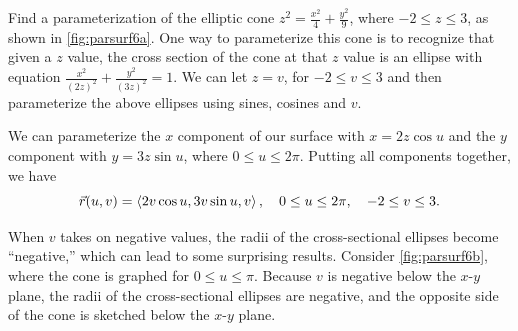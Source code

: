 \begin{example}\label{ex_parsurf6}%
Find
%
%
a parameterization of the elliptic cone $z^2 = \frac{x^2}{4}+\frac{y^2}{9}$, where $-2\leq z\leq 3$, as shown in \autoref{fig:parsurf6a}.
\solution
One way to parameterize this cone is to recognize that given a $z$ value, the cross section of the cone at that $z$ value is an ellipse with equation $\frac{x^2}{(2z)^2} + \frac{y^2}{(3z)^2}=1$. We can let $z=v$, for $-2\leq v\leq 3$ and then parameterize the above ellipses using sines, cosines and $v$.

We can parameterize the $x$ component of our surface with $x=2z\cos u$ and the $y$ component with $y=3z\sin u$, where $0\leq u\leq 2\pi$. Putting all components together, we have
%
%
\[
\vec r(u,v) = \left\langle 2v\cos u, 3v\sin u, v\right\rangle,
\quad 0\leq u\leq 2\pi,\quad -2\leq v\leq 3.
\]

When $v$ takes on negative values, the radii of the cross-sectional ellipses become ``negative,'' which can lead to some surprising results. Consider \autoref{fig:parsurf6b}, where the cone is graphed for $0\leq u\leq \pi$. Because $v$ is negative below the $x$-$y$ plane, the radii of the cross-sectional ellipses are negative, and the opposite side of the cone is sketched below the $x$-$y$ plane.
\end{example}

